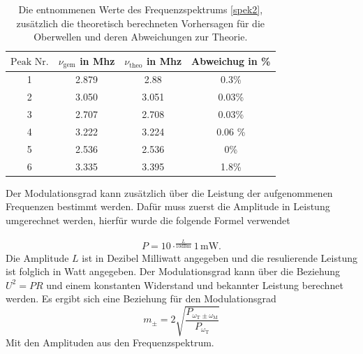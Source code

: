  \begin{table}
   \centering
   \caption{Die entnommenen Werte des Frequenzspektrums \ref{spek2}, zusätzlich
   die theoretisch berechneten Vorhersagen für die Oberwellen und deren
   Abweichungen zur Theorie.}
   \label{Tab1}
   \begin{tabular}{c|c|c|c}
     \toprule
$\text{Peak Nr.}$& $\nu_\text{gem}$ in Mhz & $\nu_\text{theo}$ in Mhz & Abweichug in \% \\
     \midrule
     1  & 2.879 &2.88 & 0.3\% \\
     2  & 3.050 & 3.051 & 0.03\% \\
     3  & 2.707  & 2.708 & 0.03\%\\
     4  & 3.222 & 3.224  & 0.06 \% \\
     5  & 2.536 & 2.536  & 0\%  \\
     6  & 3.335 & 3.395  &  1.8\%  \\
     \bottomrule
   \end{tabular}
 \end{table}
Der Modulationsgrad kann zusätzlich über die Leistung der aufgenommenen Frequenzen
bestimmt werden. Dafür muss zuerst die Amplitude in Leistung umgerechnet werden,
hierfür wurde die folgende Formel verwendet

\begin{align}
 P= 10\cdot ^{\frac{L}{10 \text{dBm}}}1\, \text{mW}.
\label{watt}
\end{align}
Die Amplitude $L$ ist in Dezibel Milliwatt angegeben und die resulierende Leistung
ist folglich in Watt angegeben. Der Modulationsgrad kann über
die Beziehung $U^2= PR$ und einem konstanten Widerstand und bekannter
Leistung berechnet werden. Es ergibt sich eine Beziehung für den Modulationsgrad
$$m_{\pm} = 2 \sqrt{ \frac{ P_{\omega_\text{T}\pm \omega_\text{M}}}{P_{\omega_{\text{T}}}} }$$
Mit den Amplituden aus den Frequenzspektrum.


